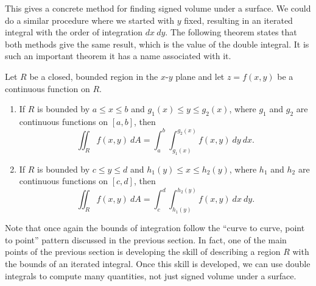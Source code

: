 This gives a concrete method for finding signed volume under a surface. We could do a similar procedure where we started with $y$ fixed, resulting in an iterated integral with the order of integration $dx\ dy$. The following theorem states that both methods give the same result, which is the value of the double integral. It is such an important theorem it has a name associated with it.

{Let $R$ be a closed, bounded region in the $x$-$y$ plane and let $z=f(x,y)$ be a continuous function on $R$.%
\begin{enumerate}
	\item If $R$ is bounded by $a\leq x\leq b$ and $g_1(x)\leq y\leq g_2(x)$, where $g_1$ and $g_2$ are continuous functions on $[a,b]$, then
	$$\iint_R f(x,y)\ dA = \int_a^b\int_{g_1(x)}^{g_2(x)} f(x,y)\ dy\ dx.$$
	
	\item If $R$ is bounded by $c\leq y\leq d$ and $h_1(y)\leq x\leq h_2(y)$, where $h_1$ and $h_2$ are continuous functions on $[c,d]$, then
	$$\iint_R f(x,y)\ dA = \int_c^d\int_{h_1(y)}^{h_2(y)} f(x,y)\ dx\ dy.$$
\end{enumerate}
}

Note that once again the bounds of integration follow the ``curve to curve, point to point'' pattern discussed in the previous section. In fact, one of the main points of the previous section is developing the skill of describing a region $R$ with the bounds of an iterated integral. Once this skill is developed, we can use double integrals to compute many quantities, not just signed volume under a surface.\\

